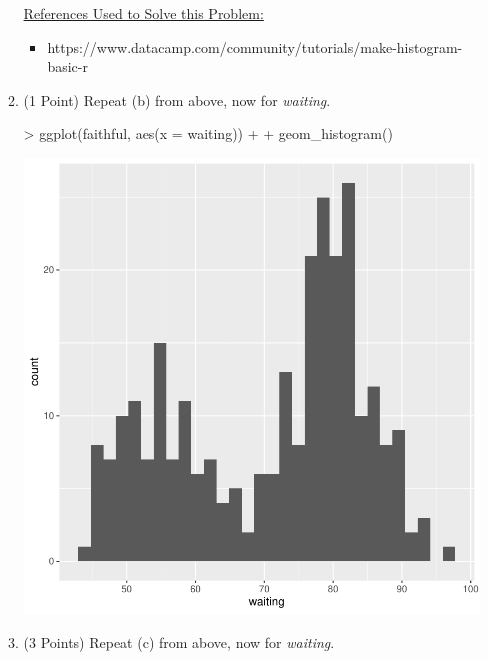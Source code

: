 \documentclass[12pt,letterpaper,final]{article}
\begin{document}
\begin{enumerate}
\begin{enumerate}
\underline{References Used to Solve this Problem:}
\begin{itemize}
\item https://www.datacamp.com/community/tutorials/make-histogram-basic-r
\end{itemize}





\item (1 Point) Repeat (b) from above, now for {\it waiting}.

\begin{Schunk}
\begin{Sinput}
> ggplot(faithful, aes(x = waiting)) + 
+   geom_histogram()
\end{Sinput}
\end{Schunk}
\includegraphics{rnw_example-006}





\item (3 Points) Repeat (c) from above, now for {\it waiting}.


\end{enumerate}
\end{enumerate}
\end{document}
